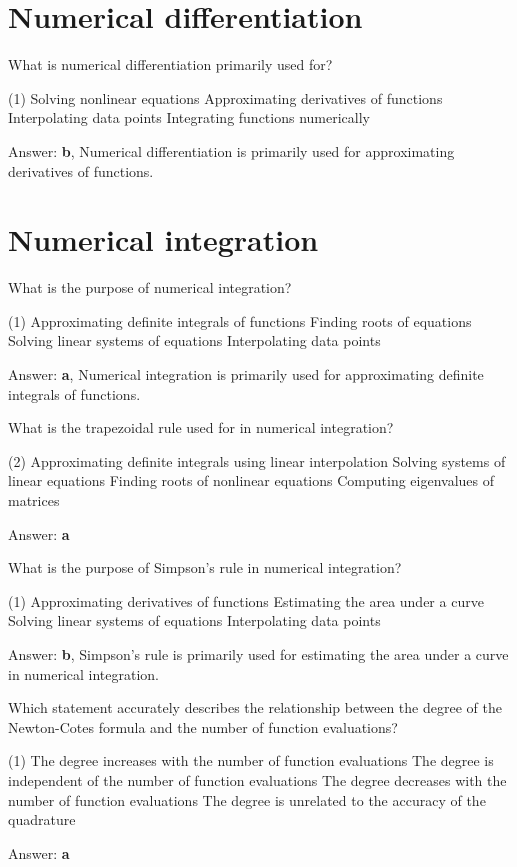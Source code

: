 \documentclass{exam}
\begin{document}
\begin{questions}
	\section{Numerical differentiation}

	\question What is numerical differentiation primarily used for?
	\begin{tasks}(1)
		\task Solving nonlinear equations
		\task Approximating derivatives of functions
		\task Interpolating data points
		\task Integrating functions numerically
	\end{tasks}
	Answer: \textbf{b}, Numerical differentiation is primarily used for approximating derivatives of functions.

	\section{Numerical integration}

	\question What is the purpose of numerical integration?
	\begin{tasks}(1)
		\task Approximating definite integrals of functions
		\task Finding roots of equations
		\task Solving linear systems of equations
		\task Interpolating data points
	\end{tasks}
	Answer: \textbf{a}, Numerical integration is primarily used for approximating definite integrals of functions.

	\question What is the trapezoidal rule used for in numerical integration?
	\begin{tasks}(2)
		\task Approximating definite integrals using linear interpolation
		\task Solving systems of linear equations
		\task Finding roots of nonlinear equations
		\task Computing eigenvalues of matrices
	\end{tasks}
	Answer: \textbf{a}

	\question What is the purpose of Simpson's rule in numerical integration?
	\begin{tasks}(1)
		\task Approximating derivatives of functions
		\task Estimating the area under a curve
		\task Solving linear systems of equations
		\task Interpolating data points
	\end{tasks}
	Answer: \textbf{b}, Simpson's rule is primarily used for estimating the area under a curve in numerical integration.

	\question Which statement accurately describes the relationship between the degree of the Newton-Cotes formula and the number of function evaluations?
	\begin{tasks}(1)
		\task The degree increases with the number of function evaluations
		\task The degree is independent of the number of function evaluations
		\task The degree decreases with the number of function evaluations
		\task The degree is unrelated to the accuracy of the quadrature
	\end{tasks}
	Answer: \textbf{a}


\end{questions}
\end{document}
